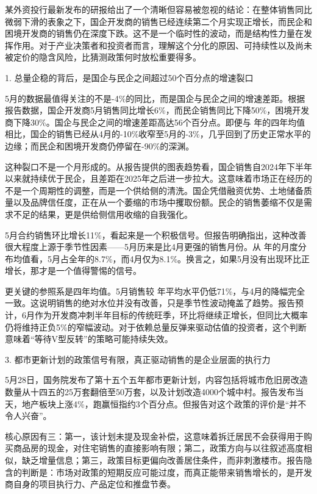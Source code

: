 \documentclass[11pt]{ctexart}
\begin{document}
某外资投行最新发布的研报给出了一个清晰但容易被忽视的结论：在整体销售同比微弱下滑的表象之下，国企开发商的销售已经连续第二个月实现正增长，而民企和困境开发商的销售仍在深度下跌。这不是一个临时性的波动，而是结构性力量在发挥作用。对于产业决策者和投资者而言，理解这个分化的原因、可持续性以及尚未被定价的隐含风险，比猜测政策何时放松重要得多。

1. 总量企稳的背后，是国企与民企之间超过50个百分点的增速裂口

5月的数据最值得关注的不是-4\%的同比，而是国企与民企之间的增速差距。根据报告数据，国企开发商5月销售同比增长6\%，而民企销售同比下降50\%，困境开发商下降30\%。国企与民企之间的增速差距高达56个百分点。即便与 年的四年均值相比，国企的销售已经从4月的-10\%收窄至5月的-3\%，几乎回到了历史正常水平的边缘；而民企和困境开发商仍停留在-90\%的深渊。

这种裂口不是一个月形成的。从报告提供的图表趋势看，国企销售自2024年下半年以来就持续优于民企，且差距在2025年之后进一步拉大。这意味着市场正在经历的不是一个周期性的调整，而是一个供给侧的清洗。国企凭借融资优势、土地储备质量以及品牌信任度，正在从一个萎缩的市场中攫取份额。民企的销售萎缩不仅是需求不足的结果，更是供给侧信用收缩的自我强化。

5月合约销售环比增长11\%，看起来是一个积极信号。但报告明确指出，这种改善很大程度上源于季节性因素——5月历来是比4月更强的销售月份。从 年的月度分布均值看，5月占全年的8.7\%，而4月仅为8.1\%。换言之，如果5月没有出现环比正增长，那才是一个值得警惕的信号。

更关键的参照系是四年均值。5月销售较 年平均水平仍低71\%，与4月的降幅完全一致。这说明销售的绝对水位并没有改善，只是季节性波动掩盖了趋势。报告预计，6月作为开发商冲刺半年目标的传统旺季，环比将继续正增长，但同比大概率仍将维持正负5\%的窄幅波动。对于依赖总量反弹来驱动估值的投资者，这个判断意味着“等待V型反转”的策略可能持续失效。

3. 都市更新计划的政策信号有限，真正驱动销售的是企业层面的执行力

5月28日，国务院发布了第十五个五年都市更新计划，内容包括将城市危旧房改造数量从十四五的25万套翻倍至50万套，以及计划改造4000个城中村。报告发布当天，地产板块上涨4\%，跑赢恒指约3个百分点。但报告对这个政策的评价是“并不令人兴奋”。

核心原因有三：第一，该计划未提及现金补偿，这意味着拆迁居民不会获得用于购买商品房的现金，对住宅销售的直接影响有限；第二，政策方向与以往叙述高度相似，缺乏增量信息；第三，政策目标更偏向改善居住条件，而非刺激楼市。报告隐含的判断是：市场对政策的短期反应可能过度，而真正能带来销售增长的，是开发商自身的项目执行力、产品定位和推盘节奏。
\end{document}
